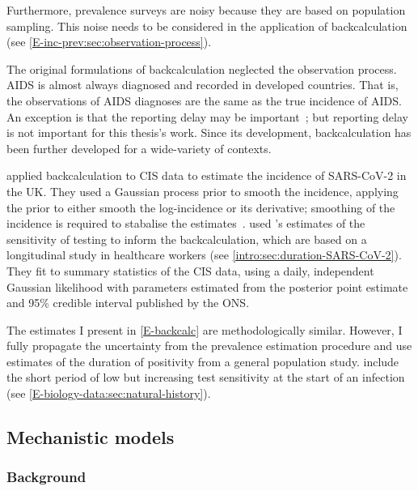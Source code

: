 \documentclass[thesis.tex]{subfiles}
\begin{document}
Furthermore, prevalence surveys are noisy because they are based on population sampling.
This noise needs to be considered in the application of backcalculation (see \cref{E-inc-prev:sec:observation-process}).

The original formulations of backcalculation neglected the observation process.
AIDS is almost always diagnosed and recorded in developed countries.
That is, the observations of AIDS diagnoses are the same as the true incidence of AIDS.
An exception is that the reporting delay may be important~\autocite{paganoHIV}; but reporting delay is not important for this thesis's work.
Since its development, backcalculation has been further developed for a wide-variety of contexts.

\Textcite{abbottCISincidence} applied backcalculation to CIS data to estimate the incidence of SARS-CoV-2 in the UK.
They used a Gaussian process prior to smooth the incidence, applying the prior to either smooth the log-incidence or its derivative; smoothing of the incidence is required to stabalise the estimates~\autocite{brookmeyerBackcalculation}.
\Textcite{abbottCISincidence} used \textcite{hellewellPCRSensitivity}'s estimates of the sensitivity of testing to inform the backcalculation, which are based on a longitudinal study in healthcare workers (see \cref{intro:sec:duration-SARS-CoV-2}).
They fit to summary statistics of the CIS data, using a daily, independent Gaussian likelihood with parameters estimated from the posterior point estimate and 95\% credible interval published by the ONS.

The estimates I present in \cref{E-backcalc} are methodologically similar.
However, I fully propagate the uncertainty from the prevalence estimation procedure and use estimates of the duration of positivity from a general population study.
\Textcite{abbottCISincidence} include the short period of low but increasing test sensitivity at the start of an infection (see \cref{E-biology-data:sec:natural-history}).


\subsection{Mechanistic models}

\subsubsection{Background}
\end{document}
